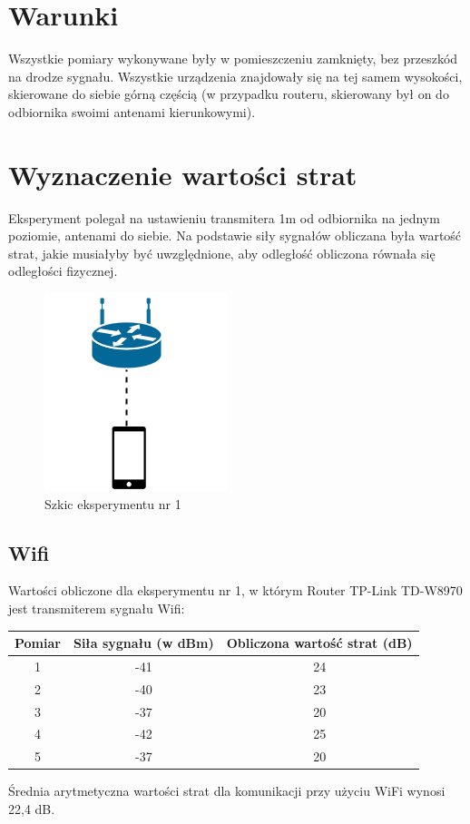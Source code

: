 \section{Warunki}
Wszystkie pomiary wykonywane były w pomieszczeniu zamknięty, bez przeszkód na drodze sygnału. Wszystkie urządzenia znajdowały się na tej samem wysokości, skierowane do siebie górną częścią (w przypadku routeru, skierowany był on do odbiornika swoimi antenami kierunkowymi).
\section{Wyznaczenie wartości strat}
Eksperyment polegał na ustawieniu transmitera 1m od odbiornika na jednym poziomie, antenami do siebie. Na podstawie siły sygnałów obliczana była wartość strat, jakie musiałyby być uwzględnione, aby odległość obliczona równała się odległości fizycznej.\\			
\begin{figure}[H]
	\centering			
	\caption{Szkic eksperymentu nr 1}
	\includegraphics{exper1}
\end{figure}
\subsection{Wifi}
	Wartości obliczone dla eksperymentu nr 1, w którym Router TP-Link TD-W8970 jest transmiterem sygnału Wifi:
	\begin{center}
		\begin{minipage}{\linewidth}
			\begin{tabular}{|c|c|c|}
				\hline 
				Pomiar & Siła sygnału (w dBm) & Obliczona wartość strat (dB) \\ 
				\hline 
				1 & -41 & 24 \\ 
				\hline 
				2 & -40 & 23 \\ 
				\hline 
				3 & -37 & 20 \\ 
				\hline 
				4 & -42 & 25 \\ 
				\hline 
				5 & -37 & 20 \\ 
				\hline 
			\end{tabular} 
		\end{minipage} 
	\end{center}
Średnia arytmetyczna wartości strat dla komunikacji przy użyciu WiFi wynosi 22,4 dB.
